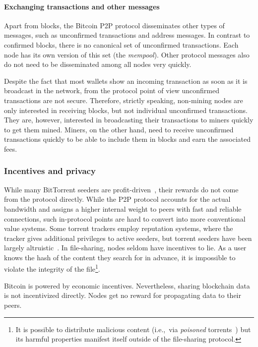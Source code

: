 \paragraph{Exchanging transactions and other messages}
Apart from blocks, the Bitcoin P2P protocol disseminates other types of messages, such as unconfirmed transactions and address messages.
In contrast to confirmed blocks, there is no canonical set of unconfirmed transactions.
Each node has its own version of this set (the \textit{mempool}).
Other protocol messages also do not need to be disseminated among all nodes very quickly.

Despite the fact that most wallets show an incoming transaction as soon as it is broadcast in the network, from the protocol point of view unconfirmed transactions are not secure.
Therefore, strictly speaking, non-mining nodes are only interested in receiving blocks, but not individual unconfirmed transactions.
They are, however, interested in broadcasting their transactions to miners quickly to get them mined.
Miners, on the other hand, need to receive unconfirmed transactions quickly to be able to include them in blocks and earn the associated fees.



\subsubsection{Incentives and privacy}

While many BitTorrent seeders are profit-driven~\cite{Rumin2010}, their rewards do not come from the protocol directly.
While the P2P protocol accounts for the actual bandwidth and assigns a higher internal weight to peers with fast and reliable connections, such in-protocol points are hard to convert into more conventional value systems.
Some torrent trackers employ reputation systems, where the tracker gives additional privileges to active seeders, but torrent seeders have been largely altruistic~\cite{Rehn2004}.
In file-sharing, nodes seldom have incentives to lie.
As a user knows the hash of the content they search for in advance, it is impossible to violate the integrity of the file\footnote{It is possible to distribute malicious content (i.e.,~via \textit{poisoned} torrents~\cite{Lou2006}) but its harmful properties manifest itself outside of the file-sharing protocol.}.


Bitcoin is powered by economic incentives.
Nevertheless, sharing blockchain data is not incentivized directly.
Nodes get no reward for propagating data to their peers.

